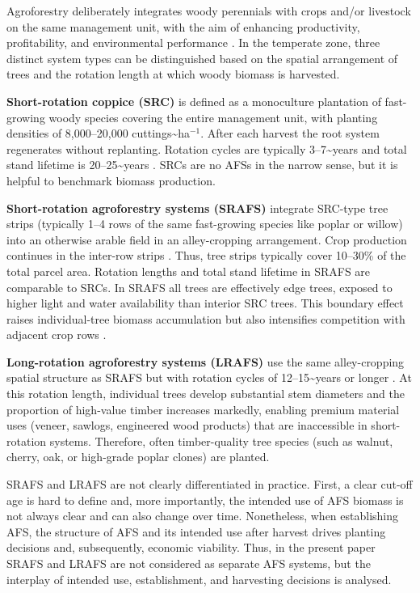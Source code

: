 \documentclass[preprint,review,1p,authoryear]{elsarticle} %
\begin{document}
Agroforestry deliberately integrates woody perennials with crops and/or
livestock on the same management unit, with the aim of enhancing
productivity, profitability, and environmental performance
\citep{Nair1993_IntroAgroforestry, Toensmeier2017_Carbon_Agroforestry}. In
the temperate zone, three distinct system types can be distinguished
based on the spatial arrangement of trees and the rotation length at
which woody biomass is harvested.

\textbf{Short-rotation coppice (SRC)} is defined as a monoculture plantation
of fast-growing woody species covering the entire management unit, with
planting densities of 8,000--20,000 cuttings\textasciitilde ha\(^{-1}\). After each
harvest the root system regenerates without replanting. Rotation cycles
are typically 3--7\textasciitilde years and total stand lifetime is 20--25\textasciitilde years
\citep{Trnka2008_Poplar_SRF, Faasch2012_SRC_Economics}. SRCs are no AFSs in
the narrow sense, but it is helpful to benchmark biomass production.

\textbf{Short-rotation agroforestry systems (SRAFS)} integrate SRC-type tree
strips (typically 1--4 rows of the same fast-growing species like poplar
or willow) into an otherwise arable field in an alley-cropping
arrangement. Crop production continues in the inter-row strips
\citep{Huber2018_SRAFS_growth, Graves2007_Agroforestry_Economics}. Thus,
tree strips typically cover 10--30\% of the total parcel area. Rotation
lengths and total stand lifetime in SRAFS are comparable to SRCs. In
SRAFS all trees are effectively edge trees, exposed to higher light and
water availability than interior SRC trees. This boundary effect raises
individual-tree biomass accumulation but also intensifies competition
with adjacent crop rows \citep{Huber2018_SRAFS_growth}.

\textbf{Long-rotation agroforestry systems (LRAFS)} use the same
alley-cropping spatial structure as SRAFS but with rotation cycles of
12--15\textasciitilde years or longer \citep{Graves2007_Agroforestry_Economics, Nair1993_IntroAgroforestry}. At this rotation length, individual trees
develop substantial stem diameters and the proportion of high-value
timber increases markedly, enabling premium material uses (veneer,
sawlogs, engineered wood products) that are inaccessible in
short-rotation systems. Therefore, often timber-quality tree species
(such as walnut, cherry, oak, or high-grade poplar clones) are planted.

SRAFS and LRAFS are not clearly differentiated in practice. First, a
clear cut-off age is hard to define and, more importantly, the intended
use of AFS biomass is not always clear and can also change over time.
Nonetheless, when establishing AFS, the structure of AFS and its
intended use after harvest drives planting decisions and, subsequently,
economic viability. Thus, in the present paper SRAFS and LRAFS are not
considered as separate AFS systems, but the interplay of intended use,
establishment, and harvesting decisions is analysed.
\end{document}
